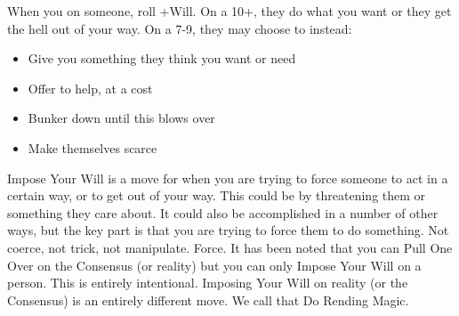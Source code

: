 



\begin{multicols}{3}

  \begin{move}
    When you  on someone, roll +Will. On a
    10+, they do what you want or they get the hell out of your
    way. On a 7-9, they may choose to instead:
    \begin{itemize}
      \setlength\itemsep{-.5em}
    \item Give you something they think you want or need
    \item Offer to help, at a cost
    \item Bunker down until this blows over
    \item Make themselves scarce
    \end{itemize}
\begin{movedetail}
  Impose Your Will is a move for when you are trying to force someone
  to act in a certain way, or to get out of your way. This could be by
  threatening them or something they care about. It could also be
  accomplished in a number of other ways, but the key part is that you
  are trying to force them to do something. Not coerce, not trick, not
  manipulate. Force. It has been noted that you can Pull One Over on
  the Consensus (or reality) but you can only Impose Your Will on a
  person. This is entirely intentional. Imposing Your Will on reality
  (or the Consensus) is an entirely different move. We call that Do
  Rending Magic.
\end{movedetail}
  \end{move}

  \SEPARATOR


\end{multicols}
